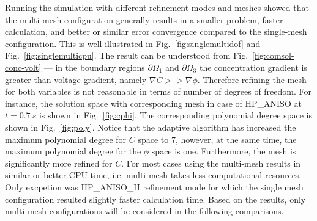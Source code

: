 Running the simulation with different refinement modes 
and meshes showed that the multi-mesh configuration generally results in
a smaller problem, faster calculation, and better or similar error convergence
compared to the single-mesh configuration.
This is well illustrated in Fig.~\ref{fig:singlemultidof} 
and Fig.~\ref{fig:singlemulticpu}.
The result can be understood from Fig.~\ref{fig:comsol-conc-volt} --- in the boundary
regions $\partial \Omega_1$ and $\partial\Omega_3$ the concentration gradient
is greater than voltage gradient, namely $\nabla C >> \nabla \phi$. Therefore
refining the mesh for both variables is not reasonable in terms of
number of degrees of freedom. For instance,
the solution space with corresponding mesh in case of
HP\_ANISO at $t=0.7\ s$ is shown in Fig.~\ref{fig:cphi}. The corresponding polynomial
degree space is shown in Fig.~\ref{fig:poly}. Notice that the adaptive algorithm
has increased the maximum polynomial degree for $C$ space to 7, however,
at the same time, the maximum polynomial degree for the $\phi$ space is one. Furthermore,
the mesh is significantly more refined for $C$.
For most cases using the multi-mesh results in similar or better CPU time, i.e.
multi-mesh takes less computational resources. Only excpetion was HP\_ANISO\_H 
refinement mode for which the single mesh configuration resulted slightly faster
calculation time. 
Based on the results, only multi-mesh configurations will be considered
in the following comparisons.

